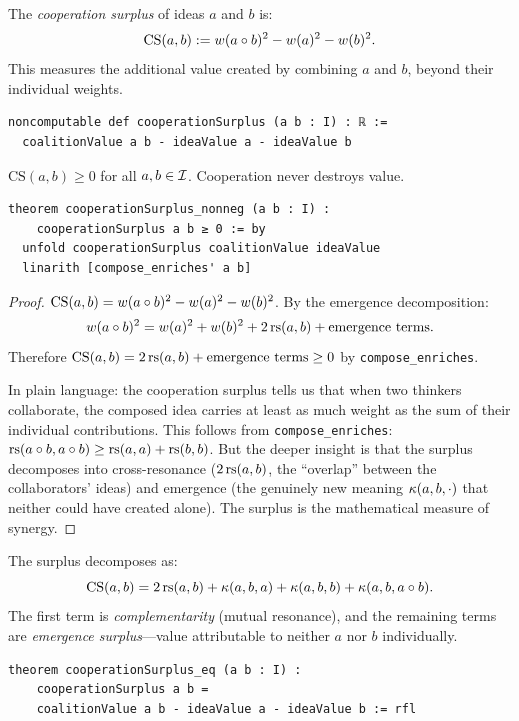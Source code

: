\begin{definition}
\label{def:cooperation-surplus}
The \emph{cooperation surplus} of ideas $a$ and $b$ is:
\[
  \text{CS}(a, b) := w(a \circ b)^2 - w(a)^2 - w(b)^2.
\]
This measures the additional value created by combining $a$ and $b$, beyond
their individual weights.

\begin{lstlisting}[caption={Lean 4: Cooperation surplus}]
noncomputable def cooperationSurplus (a b : I) : ℝ :=
  coalitionValue a b - ideaValue a - ideaValue b
\end{lstlisting}
\end{definition}

\begin{theorem}
\label{thm:surplus-nonneg}
$\text{CS}(a, b) \geq 0$ for all $a, b \in \mathcal{I}$.  Cooperation never
destroys value.

\begin{lstlisting}[caption={Lean 4: Surplus non-negativity}]
theorem cooperationSurplus_nonneg (a b : I) :
    cooperationSurplus a b ≥ 0 := by
  unfold cooperationSurplus coalitionValue ideaValue
  linarith [compose_enriches' a b]
\end{lstlisting}
\end{theorem}

\begin{proof}
$\text{CS}(a, b) = w(a \circ b)^2 - w(a)^2 - w(b)^2$.
By the emergence decomposition:
\[
  w(a \circ b)^2 = w(a)^2 + w(b)^2 + 2\,\mathrm{rs}(a, b) + \text{emergence terms}.
\]
Therefore $\text{CS}(a, b) = 2\,\mathrm{rs}(a, b) + \text{emergence terms} \geq 0$
by \texttt{compose\_enriches}.

In plain language: the cooperation surplus tells us that when two thinkers
collaborate, the composed idea carries at least as much weight as the sum
of their individual contributions.  This follows from
\texttt{compose\_enriches}: $\mathrm{rs}(a \circ b, a \circ b) \geq \mathrm{rs}(a, a)
+ \mathrm{rs}(b, b)$.  But the deeper insight is that the surplus decomposes into
cross-resonance ($2\,\mathrm{rs}(a, b)$, the ``overlap'' between the collaborators'
ideas) and emergence (the genuinely new meaning $\kappa(a, b, \cdot)$ that
neither could have created alone).  The surplus is the mathematical measure
of synergy.
\end{proof}

\begin{theorem}
\label{thm:surplus-decomposition}
The surplus decomposes as:
\[
  \text{CS}(a, b) = 2\,\mathrm{rs}(a, b) + \kappa(a, b, a) + \kappa(a, b, b)
  + \kappa(a, b, a \circ b).
\]
The first term is \emph{complementarity} (mutual resonance), and the
remaining terms are \emph{emergence surplus}---value attributable to neither
$a$ nor $b$ individually.

\begin{lstlisting}[caption={Lean 4: Surplus equals marginal contribution}]
theorem cooperationSurplus_eq (a b : I) :
    cooperationSurplus a b =
    coalitionValue a b - ideaValue a - ideaValue b := rfl
\end{lstlisting}
\end{theorem}


